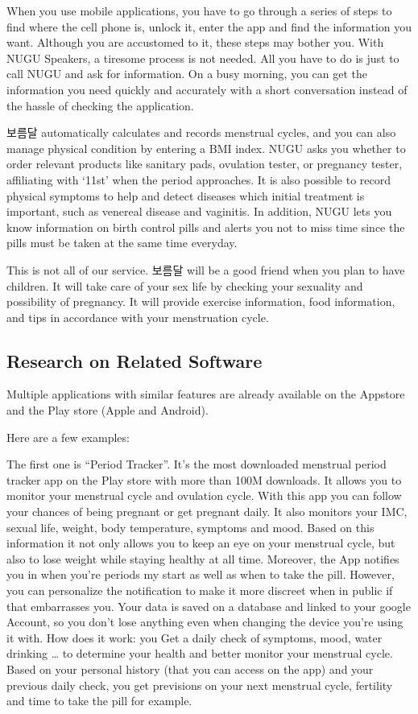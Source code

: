 \documentclass[conference]{IEEEtran}
\begin{document}
When you use mobile applications, you have to go through a series of steps to find where the cell phone is, unlock it, enter the app and find the information you want. Although you are accustomed to it, these steps may bother you. With NUGU Speakers, a tiresome process is not needed. All you have to do is just to call NUGU and ask for information. On a busy morning, you can get the information you need quickly and accurately with a short conversation instead of the hassle of checking the application.

보름달 automatically calculates and records menstrual cycles, and you can also manage physical condition by entering a BMI index. NUGU asks you whether to order relevant products like sanitary pads, ovulation tester, or pregnancy tester, affiliating with ‘11st’ when the period approaches. It is also possible to record physical symptoms to help and detect diseases which initial treatment is important, such as venereal disease and vaginitis. In addition, NUGU lets you know information on birth control pills and alerts you not to miss time since the pills must be taken at the same time everyday. 

This is not all of our service. 보름달 will be a good friend when you plan to have children. It will take care of your sex life by checking your sexuality and possibility of pregnancy. It will provide exercise information, food information, and tips in accordance with your menstruation cycle.

\subsection{Research on Related Software}
Multiple applications with similar features are already available on the Appstore and the Play store (Apple and Android).

Here are a few examples: 

The first one is “Period Tracker”. It’s the most downloaded menstrual period tracker app on the Play store with more than 100M downloads. It allows you to monitor your menstrual cycle and ovulation cycle. With this app you can follow your chances of being pregnant or get pregnant daily. It also monitors your IMC, sexual life, weight, body temperature, symptoms and mood. Based on this information it not only allows you to keep an eye on your menstrual cycle, but also to lose weight while staying healthy at all time. Moreover, the App notifies you in when you’re periods my start as well as when to take the pill. However, you can personalize the notification to make it more discreet when in public if that embarrasses you. Your data is saved on a database and linked to your google Account, so you don’t lose anything even when changing the device you’re using it with. How does it work: you Get a daily check of symptoms, mood, water drinking … to determine your health and better monitor your menstrual cycle. Based on your personal history (that you can access on the app) and your previous daily check, you get previsions on your next menstrual cycle, fertility and time to take the pill for example. 
\end{document}
